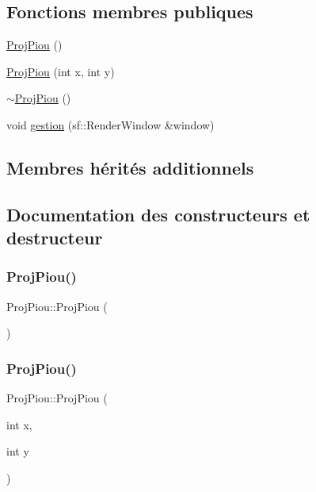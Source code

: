 \subsection*{Fonctions membres publiques}
\begin{DoxyCompactItemize}
\item 
\hyperlink{class_proj_piou_a73d8a01dc3e09f926d14b95b673fd41d}{Proj\+Piou} ()
\item 
\hyperlink{class_proj_piou_a4aa12294ad8b563aa00848e395fdf06b}{Proj\+Piou} (int x, int y)
\item 
\hyperlink{class_proj_piou_a02224f153ad53afc2b1c40b986ec6492}{$\sim$\+Proj\+Piou} ()
\item 
void \hyperlink{class_proj_piou_a964182d333ed2bf64408a7812bc4cd28}{gestion} (sf\+::\+Render\+Window \&window)
\end{DoxyCompactItemize}
\subsection*{Membres hérités additionnels}


\subsection{Documentation des constructeurs et destructeur}
\mbox{\label{class_proj_piou_a73d8a01dc3e09f926d14b95b673fd41d}} 
\subsubsection{\texorpdfstring{Proj\+Piou()}{ProjPiou()}\hspace{0.1cm}{\footnotesize\ttfamily [1/2]}}
{\footnotesize\ttfamily Proj\+Piou\+::\+Proj\+Piou (\begin{DoxyParamCaption}{ }\end{DoxyParamCaption})}

\mbox{\label{class_proj_piou_a4aa12294ad8b563aa00848e395fdf06b}} 
\subsubsection{\texorpdfstring{Proj\+Piou()}{ProjPiou()}\hspace{0.1cm}{\footnotesize\ttfamily [2/2]}}
{\footnotesize\ttfamily Proj\+Piou\+::\+Proj\+Piou (\begin{DoxyParamCaption}\item[{int}]{x,  }\item[{int}]{y }\end{DoxyParamCaption})}

